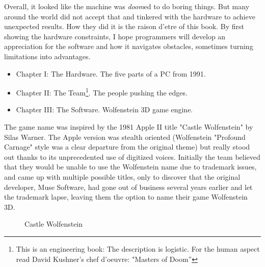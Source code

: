Overall, it looked like the machine was \emph{doom}ed to do boring things. But many around the world did not accept that and tinkered with the hardware to achieve unexpected results. How they did it is the raison d'etre of this book. By first showing the hardware constraints, I hope programmers will develop an appreciation for the software and how it navigates obstacles, sometimes turning limitations into advantages.
\begin{itemize}
\item Chapter I: The Hardware. The five parts of a PC from 1991.
\item Chapter II: The Team\footnote{This is an engineering book: The description is logistic. For the human aspect read David Kushner's chef d'oeuvre: "Masters of Doom''}. The people pushing the edges.
\item Chapter III: The Software. Wolfenstein 3D game engine.
\end{itemize}
\par
{} The game name was inspired by the 1981 Apple II title "Castle Wolfenstein" by Silas Warner. The Apple version was stealth oriented (Wolfenstein "Profound Carnage" style was a clear departure from the original theme) but really stood out thanks to its unprecedented use of digitized voices. Initially the team believed that they would be unable to use the Wolfenstein name due to trademark issues, and came up with multiple possible titles, only to discover that the original developer, Muse Software, had gone out of business several years earlier and let the trademark lapse, leaving them the option to name their game Wolfenstein 3D.

\begin{figure}[H]
\centering
{}
\caption{Castle Wolfenstein}
\end{figure}
